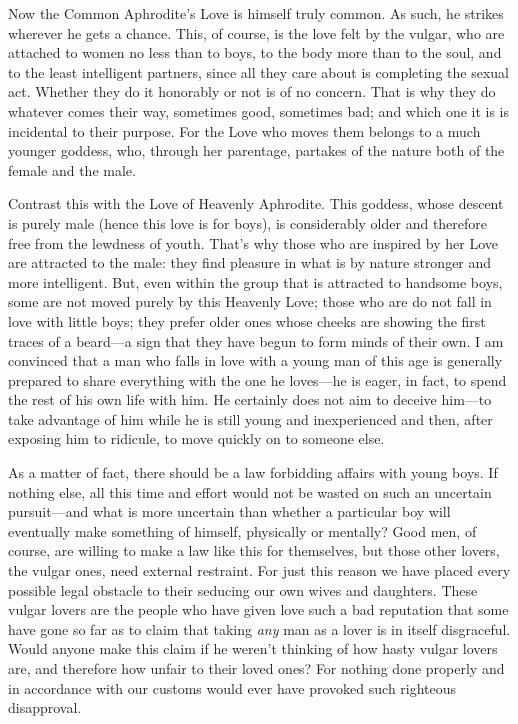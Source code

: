  Now the Common Aphrodite’s Love is himself truly common. As
such, he strikes wherever he gets a chance. This, of course, is the love
felt by the vulgar, who are attached to women no less than to boys, to
the body more than to the soul, and to the least intelligent partners,
since all they care about is completing the sexual act. Whether they do
it honorably or not is of no concern. That is why they do whatever comes
their way, sometimes good, sometimes bad; and which one it is is
incidental to their purpose. For the Love who moves them belongs to a
much younger goddess,  who, through her parentage, partakes of
the nature both of the female and the male.

Contrast this with the Love of Heavenly Aphrodite. This goddess, whose
descent is purely male (hence this love is for boys), is considerably
older and therefore free from the lewdness of youth. That’s why those
who are inspired by her Love are attracted to the male: they find
pleasure in what is by nature stronger and more intelligent. But, even
within the group that  is attracted to handsome boys, some are
not moved purely by this Heavenly Love; those who are do not fall in
love with little boys; they prefer older ones whose cheeks are showing
the first traces of a beard---a sign that they have begun to form minds
of their own. I am convinced that a man who falls in love with a young
man of this age is generally prepared to share everything with the one
he loves---he is eager, in fact, to spend the rest of his own life with
him. He certainly does not aim to deceive him---to take advantage of him
while he is still young and inexperienced and  then, after
exposing him to ridicule, to move quickly on to someone else.

As a matter of fact, there should be a law forbidding affairs with young
boys. If nothing else, all this time and effort would not be wasted on
such an uncertain pursuit---and what is more uncertain than whether a
particular boy will eventually make something of himself, physically or
mentally? Good men, of course, are willing to make a law like this for
themselves, but those other lovers, the vulgar ones, need external
restraint.  For just this reason we have placed every
possible legal obstacle to their seducing our own wives and daughters.
These vulgar lovers are the people who have given love such a bad
reputation that some have gone so far as to claim that taking {\em any}
man as a lover is in itself disgraceful. Would anyone make this claim if
he weren’t thinking of how hasty vulgar lovers are, and therefore how
unfair to their loved ones? For nothing done properly and in accordance
with our customs would ever have provoked such righteous disapproval.

